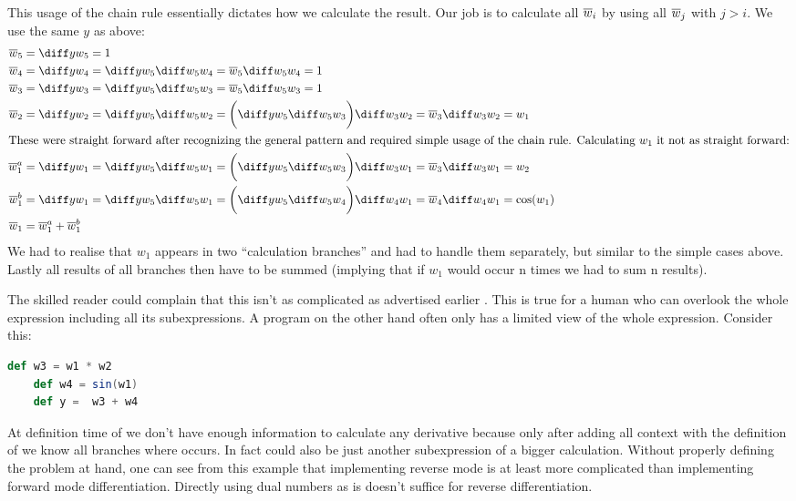 This usage of the chain rule essentially dictates how we calculate the result. Our job is to calculate all $\overline{w}_i$ by using all $\overline{w}_j$ with $j > i$.  We use the same $y$ as above:
\yExampleDiff
\begin{align*}
    \overw{5}   & = \diffyw{5} = 1                                                                                                           \\
    \overw{4}   & = \diffyw{4} = \diffyw{5}\diffw{5}{4} = \overw{5}\diffw{5}{4} = 1                                                          \\
    \overw{3}   & = \diffyw{3} = \diffyw{5}\diffw{5}{3} = \overw{5}\diffw{5}{3} = 1                                                          \\
    \overw{2}   & = \diffyw{2} = \diffyw{5}\diffw{5}{2} = \bigg(\diffyw{5}\diffw{5}{3}\bigg)\diffw{3}{2} = \overw{3}\diffw{3}{2} = w_1       \\
    \intertext{These were straight forward after recognizing the general pattern and required simple usage of the chain rule. Calculating $w_1$ it not as straight forward:}
    \overw{1}^a & = \diffyw{1} = \diffyw{5}\diffw{5}{1} = \bigg(\diffyw{5}\diffw{5}{3}\bigg)\diffw{3}{1} = \overw{3}\diffw{3}{1} = w_2       \\
    \overw{1}^b & = \diffyw{1} = \diffyw{5}\diffw{5}{1} = \bigg(\diffyw{5}\diffw{5}{4}\bigg)\diffw{4}{1} = \overw{4}\diffw{4}{1} = \cos(w_1) \\
    \overw{1}   & = \overw{1}^a + \overw{1}^b
\end{align*}
We had to realise that $w_1$ appears in two ``calculation branches'' and had to handle them separately, but similar to the simple cases above. Lastly all results of all branches then have to be summed (implying that if $w_1$ would occur n times we had to sum n results).

The skilled reader could complain that this isn't as complicated as advertised \todowording earlier . This is true for a human who can overlook the whole expression including all its subexpressions. A program on the other hand often only has a limited view of the whole expression. Consider this:
\begin{lstlisting}[language=scala, label={lst:reverseProgramVsHuman}, caption={Limited context of a program opposed to a human}]
    def w3 = w1 * w2
    def w4 = sin(w1)
    def y =  w3 + w4
\end{lstlisting}
At definition time of  we don't have enough information to calculate any derivative because only after adding all context with the definition of  we know all branches where  occurs. In fact  could also be just another subexpression of a bigger calculation. Without properly defining the problem at hand, one can see from this example that implementing reverse mode is at least more complicated than implementing forward mode differentiation. \todowording Directly using dual numbers as is doesn't suffice for reverse differentiation.

